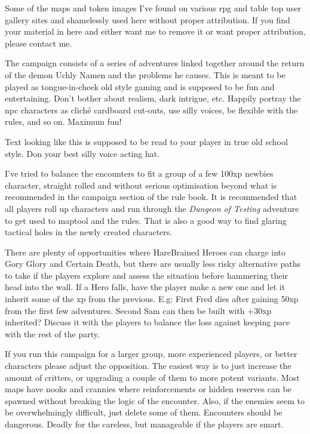 Some of the maps and token images I've found on various rpg and table top user gallery sites and shamelessly used here without proper attribution. If you find your material in here and either want me to remove it or want proper attribution, please contact me.

The campaign consists of a series of adventures linked together around the return of the demon Uchly Namen and the problems he causes. This is meant to be played as tongue-in-cheek old style gaming and is supposed to be fun and entertaining. Don't bother about realism, dark intrigue, etc. Happily portray the npc characters as cliché cardboard cut-outs, use silly voices, be flexible with the rules, and so on. Maximum fun!

\begin{readoutloud}
Text looking like this is supposed to be read to your player in true old school style. Don your best silly voice acting hat.
\end{readoutloud}

I've tried to balance the encounters to fit a group of a few 100xp newbies character, straight rolled and without serious optimisation beyond what is recommended in the campaign section of the rule book.
It is recommended that all players roll up characters and run through the \emph{Dungeon of Testing} adventure to get used to maptool and the rules. That is also a good way to find glaring tactical holes in the newly created characters.

There are plenty of opportunities where HareBrained Heroes can charge into Gory Glory and Certain Death, but there are usually less risky alternative paths to take if the players explore and assess the situation before hammering their head into the wall. If a Hero falls, have the player make a new one and let it inherit some of the xp from the previous. E.g: First Fred dies after gaining 50xp from the first few adventures. Second Sam can then be built with +30xp inherited? Discuss it with the players to balance the loss against keeping pace with the rest of the party.

If you run this campaign for a larger group, more experienced players, or better characters please adjust the opposition. The easiest way is to just increase the amount of critters, or upgrading a couple of them to more potent variants. Most maps have nooks and crannies where reinforcements or hidden reserves can be spawned without breaking the logic of the encounter. Also, if the enemies seem to be overwhelmingly difficult, just delete some of them. Encounters should be dangerous. Deadly for the careless, but manageable if the players are smart.


